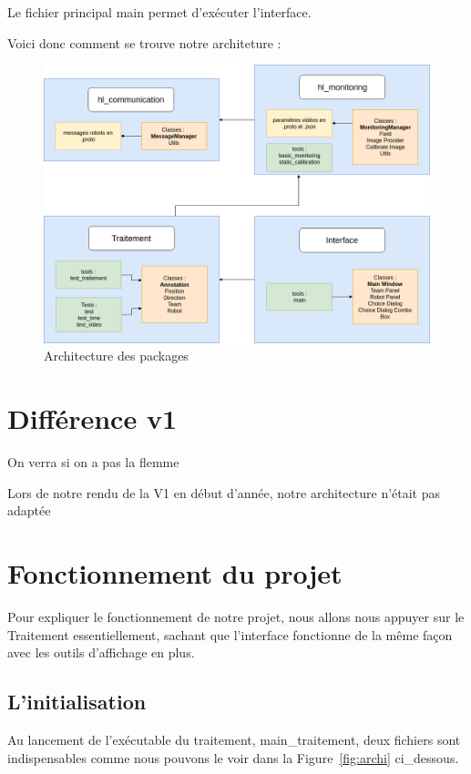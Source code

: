 Le fichier principal main permet d'exécuter l'interface.
\bigskip

Voici donc comment se trouve notre architeture :

\begin{figure}[h] 
\centering 
\includegraphics[scale = 0.3]{images/archiprojet.png}
    \caption{Architecture des packages}
\end{figure} 


\section{Différence v1}


On verra si on a pas la flemme

Lors de notre rendu de la V1 en début d'année, notre architecture n'était pas adaptée


\section{Fonctionnement du projet}

Pour expliquer le fonctionnement de notre projet, nous allons nous appuyer sur le Traitement essentiellement, sachant que l'interface fonctionne de la même façon avec les outils d'affichage en plus.

\subsection{L'initialisation}

Au lancement de l'exécutable du traitement, main\_traitement, deux fichiers sont indispensables comme nous pouvons le voir dans la Figure~\ref{fig:archi} ci\_dessous. 


